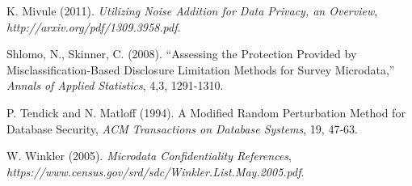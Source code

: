 \documentclass[11pt]{article}
\begin{document}
\begin{thebibliography}{}
K. Mivule (2011).  {\it Utilizing Noise Addition for Data Privacy, an 
Overview}, {\it http://arxiv.org/pdf/1309.3958.pdf}.

Shlomo, N., Skinner, C. (2008).
``Assessing the Protection Provided by Misclassification-Based Disclosure
Limitation Methods for Survey Microdata,'' {\it Annals of Applied
Statistics}, 4,3, 1291-1310.

 P. Tendick and N. Matloff (1994).  A Modified Random
Perturbation Method for Database Security, {\it ACM Transactions on
Database Systems}, 19, 47-63.

 W. Winkler (2005). {\it Microdata Confidentiality
References}, {\it
https://www.census.gov/srd/sdc/Winkler.List.May.2005.pdf}.

\end{thebibliography}{}
\end{document}
